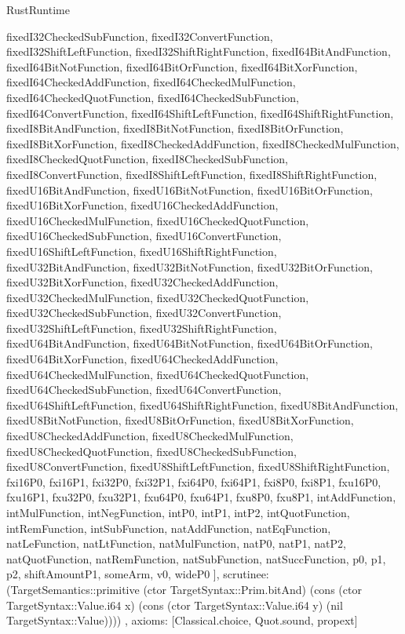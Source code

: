 \begin{lexlean}{RustRuntime}
\begin{semanticmodule}
{{      fixedI32CheckedSubFunction,
      fixedI32ConvertFunction,
      fixedI32ShiftLeftFunction,
      fixedI32ShiftRightFunction,
      fixedI64BitAndFunction,
      fixedI64BitNotFunction,
      fixedI64BitOrFunction,
      fixedI64BitXorFunction,
      fixedI64CheckedAddFunction,
      fixedI64CheckedMulFunction,
      fixedI64CheckedQuotFunction,
      fixedI64CheckedSubFunction,
      fixedI64ConvertFunction,
      fixedI64ShiftLeftFunction,
      fixedI64ShiftRightFunction,
      fixedI8BitAndFunction,
      fixedI8BitNotFunction,
      fixedI8BitOrFunction,
      fixedI8BitXorFunction,
      fixedI8CheckedAddFunction,
      fixedI8CheckedMulFunction,
      fixedI8CheckedQuotFunction,
      fixedI8CheckedSubFunction,
      fixedI8ConvertFunction,
      fixedI8ShiftLeftFunction,
      fixedI8ShiftRightFunction,
      fixedU16BitAndFunction,
      fixedU16BitNotFunction,
      fixedU16BitOrFunction,
      fixedU16BitXorFunction,
      fixedU16CheckedAddFunction,
      fixedU16CheckedMulFunction,
      fixedU16CheckedQuotFunction,
      fixedU16CheckedSubFunction,
      fixedU16ConvertFunction,
      fixedU16ShiftLeftFunction,
      fixedU16ShiftRightFunction,
      fixedU32BitAndFunction,
      fixedU32BitNotFunction,
      fixedU32BitOrFunction,
      fixedU32BitXorFunction,
      fixedU32CheckedAddFunction,
      fixedU32CheckedMulFunction,
      fixedU32CheckedQuotFunction,
      fixedU32CheckedSubFunction,
      fixedU32ConvertFunction,
      fixedU32ShiftLeftFunction,
      fixedU32ShiftRightFunction,
      fixedU64BitAndFunction,
      fixedU64BitNotFunction,
      fixedU64BitOrFunction,
      fixedU64BitXorFunction,
      fixedU64CheckedAddFunction,
      fixedU64CheckedMulFunction,
      fixedU64CheckedQuotFunction,
      fixedU64CheckedSubFunction,
      fixedU64ConvertFunction,
      fixedU64ShiftLeftFunction,
      fixedU64ShiftRightFunction,
      fixedU8BitAndFunction,
      fixedU8BitNotFunction,
      fixedU8BitOrFunction,
      fixedU8BitXorFunction,
      fixedU8CheckedAddFunction,
      fixedU8CheckedMulFunction,
      fixedU8CheckedQuotFunction,
      fixedU8CheckedSubFunction,
      fixedU8ConvertFunction,
      fixedU8ShiftLeftFunction,
      fixedU8ShiftRightFunction,
      fxi16P0,
      fxi16P1,
      fxi32P0,
      fxi32P1,
      fxi64P0,
      fxi64P1,
      fxi8P0,
      fxi8P1,
      fxu16P0,
      fxu16P1,
      fxu32P0,
      fxu32P1,
      fxu64P0,
      fxu64P1,
      fxu8P0,
      fxu8P1,
      intAddFunction,
      intMulFunction,
      intNegFunction,
      intP0,
      intP1,
      intP2,
      intQuotFunction,
      intRemFunction,
      intSubFunction,
      natAddFunction,
      natEqFunction,
      natLeFunction,
      natLtFunction,
      natMulFunction,
      natP0,
      natP1,
      natP2,
      natQuotFunction,
      natRemFunction,
      natSubFunction,
      natSuccFunction,
      p0,
      p1,
      p2,
      shiftAmountP1,
      someArm,
      v0,
      wideP0
    ],
    scrutinee: (TargetSemantics::primitive (ctor TargetSyntax::Prim.bitAnd) (cons (ctor TargetSyntax::Value.i64 x) (cons (ctor TargetSyntax::Value.i64 y) (nil TargetSyntax::Value))))
  },
  axioms: [Classical.choice, Quot.sound, propext]
}


\end{semanticmodule}
\end{lexlean}
